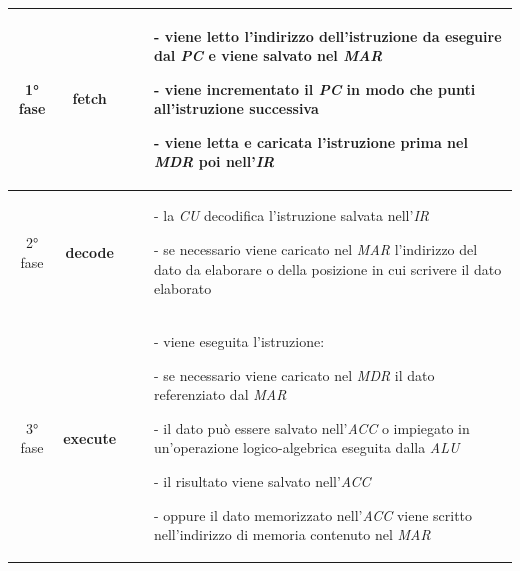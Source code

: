 \documentclass[a4paper]{article}
\begin{document}
\begin{center}
	\begin{tabularx}{\textwidth}{c c X}
		\toprule
		1° fase & \textbf{fetch} &
		\begin{itemize}[topsep=3pt, itemsep=0pt, leftmargin=5pt]
			\item[-] viene letto l'indirizzo dell'istruzione da eseguire dal \textit{PC} e viene salvato nel \textit{MAR}
			\item[-] viene incrementato il \textit{PC} in modo che punti all'istruzione successiva
			\item[-] viene letta e caricata l'istruzione prima nel \textit{MDR} poi nell'\textit{IR}
		\end{itemize} \\
		\midrule
		2° fase & \textbf{decode} &
		\begin{itemize}[topsep=3pt, itemsep=0pt, leftmargin=5pt]
			\item[-] la \textit{CU} decodifica l'istruzione salvata nell'\textit{IR}
			\item[-] se necessario viene caricato nel \textit{MAR} l'indirizzo del dato da elaborare o della posizione in cui scrivere il dato elaborato 
		\end{itemize} \\
		\midrule
		3° fase & \textbf{execute} &
		\begin{itemize}[topsep=3pt, itemsep=0pt, leftmargin=5pt]
			\item[-] viene eseguita l'istruzione:
			\item[-] se necessario viene caricato nel \textit{MDR} il dato referenziato dal \textit{MAR}
			\item[-] il dato può essere salvato nell'\textit{ACC} o impiegato in un'operazione logico-algebrica eseguita dalla \textit{ALU} 
			\item[-] il risultato viene salvato nell'\textit{ACC}
			\item[-] oppure il dato memorizzato nell'\textit{ACC} viene scritto nell'indirizzo di memoria contenuto nel \textit{MAR}
		\end{itemize} \\
		\bottomrule
	\end{tabularx}
\end{center}
\end{document}
